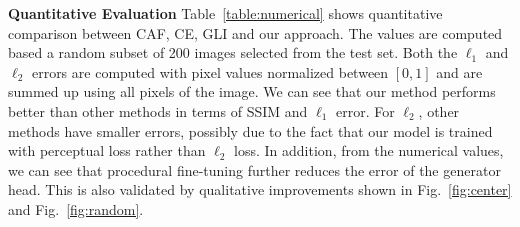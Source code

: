 \noindent\textbf{Quantitative Evaluation} Table~\ref{table:numerical} shows quantitative comparison between CAF, CE, GLI and our approach. The values are computed based a random subset of 200 images selected from the test set. Both the $\ell_1$ and $\ell_2$ errors are computed with pixel values normalized between $[0,1]$ and are summed up using all pixels of the image. We can see that our method performs better than other methods in terms of SSIM and $\ell_1$ error. For $\ell_2$, other methods have smaller errors, possibly due to the fact that our model is trained with perceptual loss rather than $\ell_2$ loss. In addition, from the numerical values, we can see that procedural fine-tuning further reduces the error of the generator head. This is also validated by qualitative improvements shown in Fig.~\ref{fig:center} and Fig.~\ref{fig:random}.  

\begin{table}[h!]
\begin{center}
  \end{center}
  \caption{Numerical comparison between CAF, CE and GLI, our generator head results and our final results. Up/down are results of center/random region completion. Note that for SSIM, larger values mean greater similarity in terms of content structure and are indicators of better performance.}
  \vspace{-10pt}
  \label{table:numerical}
\end{table}

